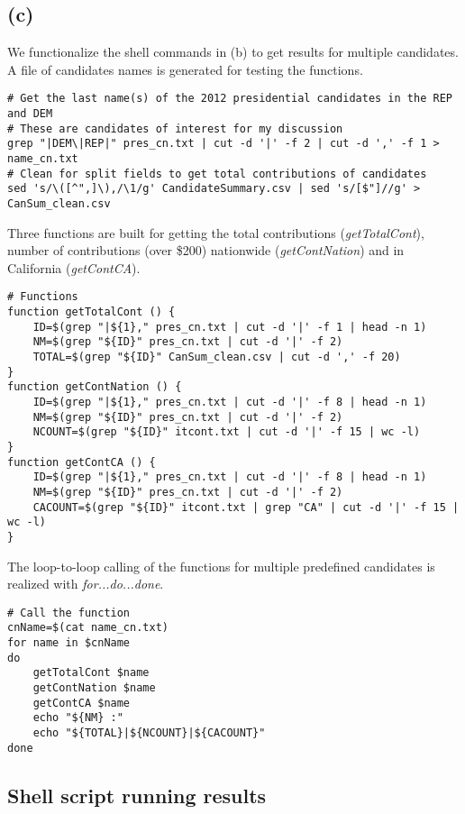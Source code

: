 \documentclass{article}
\begin{document}
\subsection*{(c)}

We functionalize the shell commands in (b) to get results for multiple candidates. A file of candidates names is generated for testing the functions.

\begin{lstlisting}
# Get the last name(s) of the 2012 presidential candidates in the REP and DEM
# These are candidates of interest for my discussion
grep "|DEM\|REP|" pres_cn.txt | cut -d '|' -f 2 | cut -d ',' -f 1 > name_cn.txt
# Clean for split fields to get total contributions of candidates
sed 's/\([^",]\),/\1/g' CandidateSummary.csv | sed 's/[$"]//g' > CanSum_clean.csv
\end{lstlisting}

Three functions are built for getting the total contributions (\textit{getTotalCont}), number of contributions 
(over \$200) nationwide (\textit{getContNation}) and in California (\textit{getContCA}).

\begin{lstlisting}
# Functions
function getTotalCont () {
    ID=$(grep "|${1}," pres_cn.txt | cut -d '|' -f 1 | head -n 1)
    NM=$(grep "${ID}" pres_cn.txt | cut -d '|' -f 2)
    TOTAL=$(grep "${ID}" CanSum_clean.csv | cut -d ',' -f 20)
}
function getContNation () {
    ID=$(grep "|${1}," pres_cn.txt | cut -d '|' -f 8 | head -n 1)
    NM=$(grep "${ID}" pres_cn.txt | cut -d '|' -f 2)
    NCOUNT=$(grep "${ID}" itcont.txt | cut -d '|' -f 15 | wc -l)
}
function getContCA () {
    ID=$(grep "|${1}," pres_cn.txt | cut -d '|' -f 8 | head -n 1)
    NM=$(grep "${ID}" pres_cn.txt | cut -d '|' -f 2)
    CACOUNT=$(grep "${ID}" itcont.txt | grep "CA" | cut -d '|' -f 15 | wc -l)
}
\end{lstlisting}

The loop-to-loop calling of the functions for multiple predefined candidates is realized with \textit{for...do...done}.

\begin{lstlisting}
# Call the function
cnName=$(cat name_cn.txt)
for name in $cnName
do
    getTotalCont $name
    getContNation $name
    getContCA $name
    echo "${NM} :"
    echo "${TOTAL}|${NCOUNT}|${CACOUNT}"
done
\end{lstlisting}

\subsection*{Shell script running results}
\end{document}
